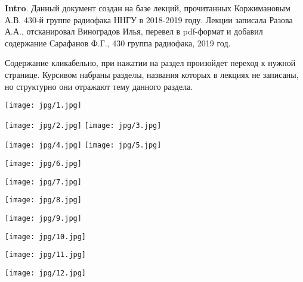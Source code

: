 \documentclass[a4paper,14pt]{extarticle}%
\begin{document}
%
\textbf{Intro}. Данный документ создан на базе лекций, прочитанных Коржимановым А.В. 430-й группе радиофака ННГУ в 2018-2019 году.  Лекции записала Разова А.А.,  отсканировал Виноградов Илья, перевел в pdf-формат и добавил содержание Сарафанов Ф.Г., 430 группа радиофака, 2019 год.

Содержание кликабельно, при нажатии на раздел произойдет переход к нужной странице. Курсивом набраны разделы, названия которых в лекциях не записаны, но структурно они отражают тему данного раздела.
\tableofcontents\newpage%
%
%
\centering%
%

%
%
\texttt{[image: jpg/1.jpg]}%
\newpage%
%
%
%
%
\texttt{[image: jpg/2.jpg]}%
\newpage%
%
%
\texttt{[image: jpg/3.jpg]}%
\newpage%
%
%
%
\texttt{[image: jpg/4.jpg]}%
\newpage%
%
%
\texttt{[image: jpg/5.jpg]}%
\newpage%
%
%
%
\texttt{[image: jpg/6.jpg]}%
\newpage%
%
%
%
\texttt{[image: jpg/7.jpg]}%
\newpage%
%
%
%
\texttt{[image: jpg/8.jpg]}%
\newpage%
%
%
%
\texttt{[image: jpg/9.jpg]}%
\newpage%
%
%
%
\texttt{[image: jpg/10.jpg]}%
\newpage%
%
%
{}%
\texttt{[image: jpg/11.jpg]}%
\newpage%
%
%
%
\texttt{[image: jpg/12.jpg]}%
\newpage%
%
%
\end{document}
